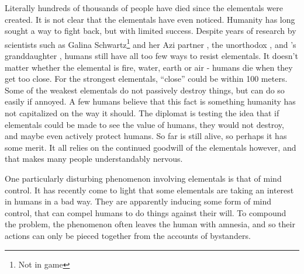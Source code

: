 \documentclass[blue]{elementals}
\begin{document}

Literally hundreds of thousands of people have died since the elementals were created. It is not clear that the elementals have even noticed. Humanity has long sought a way to fight back, but with limited success. Despite years of research by scientists such as Galina Schwartz\footnote{Not in game} and her Azi partner \cScientist{\full}, the unorthodox \cMS{\full}, and \cGrandfather{\full}'s granddaughter \cGD{}, humans still have all too few ways to resist elementals.  It doesn't matter whether the elemental is fire, water, earth or air - humans die when they get too close. For the strongest elementals, ``close'' could be within 100 meters. Some of the weakest elementals do not passively destroy things, but can do so easily if annoyed. A few humans believe that this fact is something humanity has not capitalized on the way it should. The diplomat \cDiplomat{\full} is testing the idea that if elementals could be made to see the value of humans, they would not destroy, and maybe even actively protect humans.  So far \cDiplomat{} is still alive, so perhaps it has some merit. It all relies on the continued goodwill of the elementals however, and that makes many people understandably nervous.

One particularly disturbing phenomenon involving elementals is that of mind control. It has recently come to light that some elementals are taking an interest in humans in a bad way. They are apparently inducing some form of mind control, that can compel humans to do things against their will. To compound the problem, the phenomenon often leaves the human with amnesia, and so their actions can only be pieced together from the accounts of bystanders.
\end{document}
